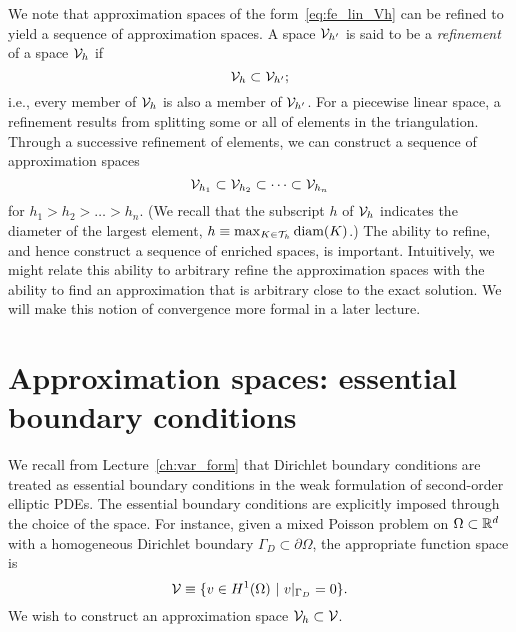 We note that approximation spaces of the form~\eqref{eq:fe_lin_Vh} can be refined to yield a sequence of approximation spaces. A space $\mathcal{V}_{h'}$ is said to be a \emph{refinement} of a space $\mathcal{V}_h$ if
\begin{equation*}
  \mathcal{V}_h \subset \mathcal{V}_{h'};
\end{equation*}
i.e., every member of $\mathcal{V}_h$ is also a member of $\mathcal{V}_{h'}$. For a piecewise linear space, a refinement results from splitting some or all of elements in the triangulation.  Through a successive refinement of elements, we can construct a sequence of approximation spaces
\begin{equation*}
  \mathcal{V}_{h_1} \subset \mathcal{V}_{h_2} \subset \cdots \subset \mathcal{V}_{h_n}
\end{equation*}
for $h_1 > h_2 > \dots > h_n$. (We recall that the subscript $h$ of $\mathcal{V}_h$ indicates the diameter of the largest element, $h \equiv \max_{K \in \mathcal{T}_h} \text{diam}(K)$.)  The ability to refine, and hence construct a sequence of enriched spaces, is important. Intuitively, we might relate this ability to arbitrary refine the approximation spaces with the ability to find an approximation that is arbitrary close to the exact solution.  We will make this notion of convergence more formal in a later lecture.

\section{Approximation spaces: essential boundary conditions}
We recall from Lecture~\ref{ch:var_form} that Dirichlet boundary conditions are treated as essential boundary conditions in the weak formulation of second-order elliptic PDEs.  The essential boundary conditions are explicitly imposed through the choice of the space.  For instance, given a mixed Poisson problem on $\Omega \subset \mathbb{R}^d$ with a homogeneous Dirichlet boundary $\Gamma_D \subset \partial \Omega$, the appropriate function space is
\begin{equation*}
  \mathcal{V} \equiv \{ v \in H^1(\Omega) \ | \ v|_{\Gamma_D} = 0 \}.
\end{equation*}
We wish to construct an approximation space $\mathcal{V}_h \subset \mathcal{V}$.


